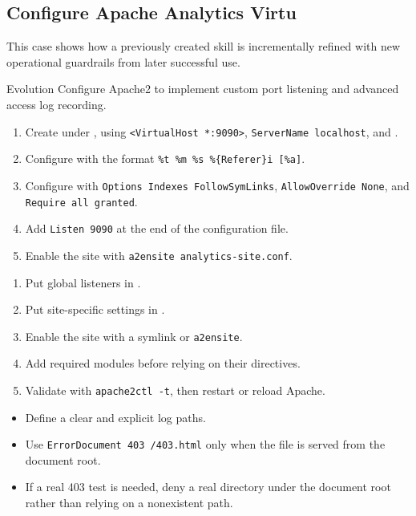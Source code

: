 \subsection{Configure Apache Analytics Virtu}
\label{app:case-apache-analytics-virtu}

\noindent This case shows how a previously created skill is incrementally refined with new operational guardrails from later successful use.\par\medskip

\begin{svpromptbox}{Evolution}
Configure Apache2 to implement custom port listening and advanced access log recording.
\begin{enumerate}
    \item Create  under , using \texttt{<VirtualHost *:9090>}, \texttt{ServerName localhost}, and .
    \item Configure  with the format \texttt{\%t \%m \%s \%\{Referer\}i [\%a]}.
    \item Configure  with \texttt{Options Indexes FollowSymLinks}, \texttt{AllowOverride None}, and \texttt{Require all granted}.
    \item Add \texttt{Listen 9090} at the end of the configuration file.
    \item Enable the site with \texttt{a2ensite analytics-site.conf}.
\end{enumerate}

\svpartsep
{}
\begin{enumerate}
    \item Put global listeners in .
    \item Put site-specific settings in .
    \item Enable the site with a symlink or \texttt{a2ensite}.
    \item Add required modules before relying on their directives.
    \item Validate with \texttt{apache2ctl -t}, then restart or reload Apache.
\end{enumerate}
\begin{itemize}
    \item Define a clear  and explicit log paths.
    \item Use \texttt{ErrorDocument 403 /403.html} only when the file is served from the document root.
    \item If a real 403 test is needed, deny a real directory under the document root rather than relying on a nonexistent path.
\end{itemize}


\end{svpromptbox}
